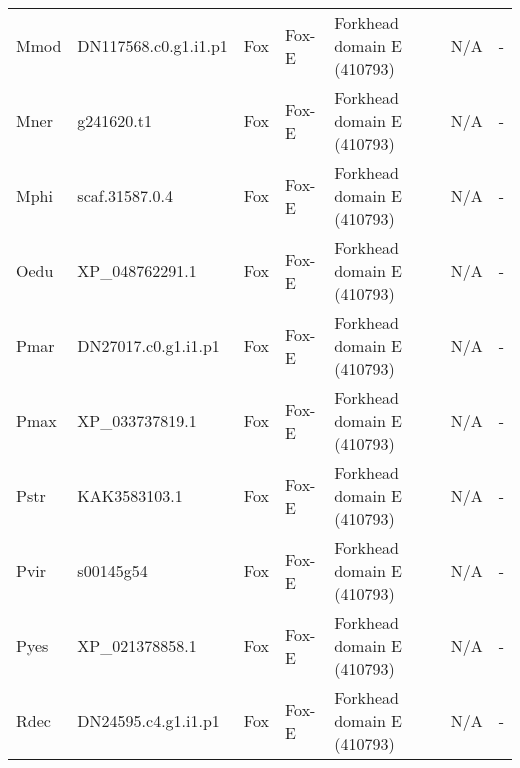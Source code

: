 \documentclass[../main.tex]{subfiles}
\begin{document}
\begin{landscape}
\begin{longtable}{lllllll}
		Mmod           & DN117568.c0.g1.i1.p1  & Fox            & Fox-E               & Forkhead domain E (410793)                  & N/A                                                                    & -                    \\
		Mner           & g241620.t1            & Fox            & Fox-E               & Forkhead domain E (410793)                  & N/A                                                                    & -                    \\
		Mphi           & scaf.31587.0.4        & Fox            & Fox-E               & Forkhead domain E (410793)                  & N/A                                                                    & -                    \\
		Oedu           & XP\_048762291.1       & Fox            & Fox-E               & Forkhead domain E (410793)                  & N/A                                                                    & -                    \\
		Pmar           & DN27017.c0.g1.i1.p1   & Fox            & Fox-E               & Forkhead domain E (410793)                  & N/A                                                                    & -                    \\
		Pmax           & XP\_033737819.1       & Fox            & Fox-E               & Forkhead domain E (410793)                  & N/A                                                                    & -                    \\
		Pstr           & KAK3583103.1          & Fox            & Fox-E               & Forkhead domain E (410793)                  & N/A                                                                    & -                    \\
		Pvir           & s00145g54             & Fox            & Fox-E               & Forkhead domain E (410793)                  & N/A                                                                    & -                    \\
		Pyes           & XP\_021378858.1       & Fox            & Fox-E               & Forkhead domain E (410793)                  & N/A                                                                    & -                    \\
		Rdec           & DN24595.c4.g1.i1.p1   & Fox            & Fox-E               & Forkhead domain E (410793)                  & N/A                                                                    & -                    \\

\end{longtable}
\end{landscape}
\end{document}
